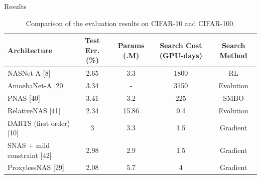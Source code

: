 \documentclass[aspectratio=169,xcolor=dvipsnames]{beamer}
\begin{document}
\begin{frame}{Results}
    \scriptsize
    \begin{table}[h]
        \centering
        \caption{Comparison of the evaluation results on CIFAR-10 and CIFAR-100.}
        \label{my-label}
        \begin{tabular}{lcccc}
            \hline
            \textbf{Architecture}           & \textbf{Test Err. (\%)} & \textbf{Params (.M)} & \textbf{Search Cost (GPU-days)} & \textbf{Search Method} \\ \hline
            NASNet-A {[}8{]}                & 2.65                    & 3.3                  & 1800                            & RL                     \\
            AmoebaNet-A {[}20{]}            & 3.34                    & -                    & 3150                            & Evolution              \\
            PNAS {[}40{]}                   & 3.41                    & 3.2                  & 225                             & SMBO                   \\
            RelativeNAS {[}41{]}            & 2.34                    & 15.86                & 0.4                             & Evolution              \\
            DARTS (first order) {[}10{]}    & 3                       & 3.3                  & 1.5                             & Gradient               \\
            SNAS + mild constraint {[}42{]} & 2.98                    & 2.9                  & 1.5                             & Gradient               \\
            ProxylessNAS {[}29{]}           & 2.08                    & 5.7                  & 4                               & Gradient               \\

\end{tabular}
\end{table}
\end{frame}
\end{document}
